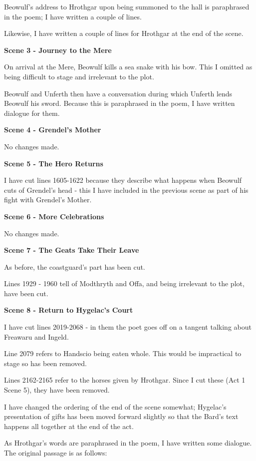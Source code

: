 \documentclass[a4paper]{article}
\begin{document}
{Beowulf's address to Hrothgar upon being summoned to the hall
is paraphrased in the poem; I have written a couple of lines.

Likewise, I have written a couple of lines for Hrothgar at the
end of the scene.

\centerline{\textbf{Scene 3 - Journey to the Mere}}

On arrival at the Mere, Beowulf kills a sea snake with his bow. 
This I omitted as being difficult to stage and irrelevant to the plot.

Beowulf and Unferth then have a conversation during which Unferth lends
Beowulf his sword. Because this is paraphrased in the poem, I have written
dialogue for them. 

\centerline{\textbf{Scene 4 - Grendel's Mother}}

No changes made.

\centerline{\textbf{Scene 5 - The Hero Returns}}

I have cut lines 1605-1622 because they describe what happens when
Beowulf cuts of Grendel's head - this I have included in the previous scene 
as part of his fight with Grendel's Mother.

\centerline{\textbf{Scene 6 - More Celebrations}}

No changes made.

\centerline{\textbf{Scene 7 - The Geats Take Their Leave}}

As before, the coastguard's part has been cut.

Lines 1929 - 1960 tell of Modthryth and Offa, and
being irrelevant to the plot, have been cut. 

\centerline{\textbf{Scene 8 - Return to Hygelac's Court}}

I have cut lines 2019-2068 - in them the poet goes off on 
a tangent talking about Freawaru and Ingeld.

Line 2079 refers to Handscio being eaten whole. This would be
impractical to stage so has been removed.

Lines 2162-2165 refer to the horses given by Hrothgar. Since 
I cut these (Act 1 Scene 5), they have been removed.

I have changed the ordering of the end of the scene somewhat;
Hygelac's presentation of gifts has been moved forward slightly
so that the Bard's text happens all together at the end of the act.

As Hrothgar's words are paraphrased in the poem, I have written some dialogue.
The original passage is as follows:

}
\end{document}
